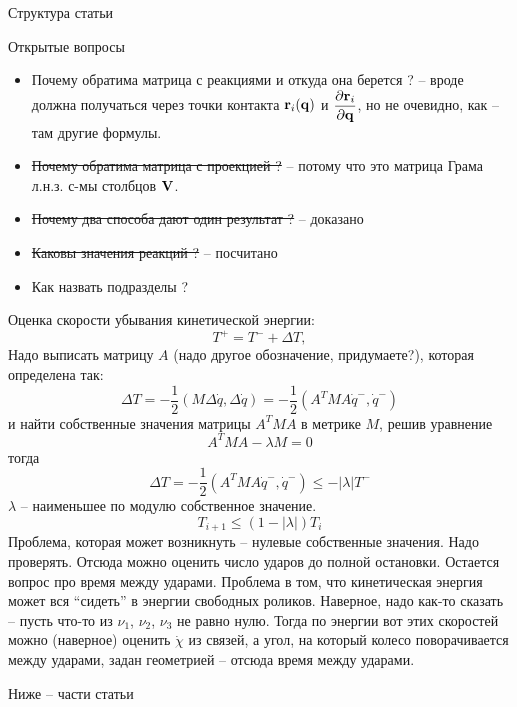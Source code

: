 



{\huge Структура статьи}


\vspace{20pt}

{\huge Открытые вопросы}
\begin{itemize}
    \item Почему обратима матрица с реакциями и откуда она берется ? -- вроде должна получаться через точки контакта $\mathbf{r}_i(\mathbf{q})$ и $\displaystyle\frac{\displaystyle \partial\mathbf{r}_i}{\displaystyle \partial\mathbf{q}}$, но не очевидно, как -- там другие формулы.
    \item \sout{Почему обратима матрица с проекцией ?} -- потому что это матрица Грама л.н.з. с-мы столбцов $\mathbf{V}$.
    \item \sout{Почему два способа дают один результат ?} -- доказано
    \item \sout{Каковы значения реакций ?} -- посчитано
    \item Как назвать подразделы ?
\end{itemize}

Оценка скорости убывания кинетической энергии:
$$
T^+ = T^- + \Delta T,
$$
Надо выписать матрицу $A$ (надо другое обозначение, придумаете?), которая определена так:
$$
\Delta T = -\frac12(M\Delta\dot{q},\Delta\dot{q}) = -\frac12(A^T M A\dot{q}^-, \dot{q}^{-})
$$
и найти собственные значения матрицы $A^T M A$ в метрике $M$, решив уравнение
$$
A^T M A - \lambda M = 0
$$
тогда 
$$
\Delta T = -\frac12(A^T M A\dot{q}^-, \dot{q}^{-}) \leq -|\lambda| T^{-}
$$
$\lambda$ -- наименьшее по модулю собственное значение.
$$
T_{i+1}\leq (1-|\lambda|) T_{i}
$$
Проблема, которая может возникнуть -- нулевые собственные значения. Надо проверять.
Отсюда можно оценить число ударов до полной остановки.
Остается вопрос про время между ударами.
Проблема в том, что кинетическая энергия может вся ``сидеть'' в энергии свободных роликов. Наверное, надо как-то сказать -- пусть что-то из $\nu_1$, $\nu_2$, $\nu_3$ не равно нулю. Тогда по энергии вот этих скоростей можно (наверное) оценить $\dot{\chi}$ из связей, а угол, на который колесо поворачивается между ударами, задан геометрией -- отсюда время между ударами.

\vspace{20pt}

{\huge Ниже -- части статьи}
\setcounter{section}{1}
\newpage

% 

















% 



